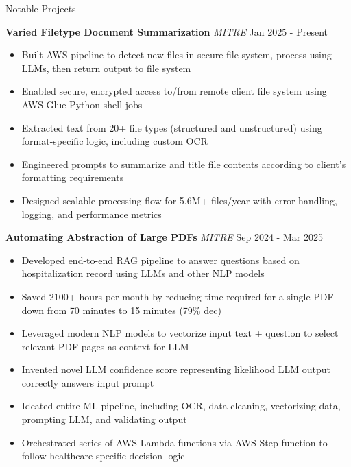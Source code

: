 \documentclass{resume} %
\begin{document}
\begin{rSection}{Notable Projects}

\textbf{Varied Filetype Document Summarization} \textit{MITRE}
\hfill Jan 2025 - Present
\begin{itemize}
    \item Built AWS pipeline to detect new files in secure file system, process using LLMs, then return output to file system
    \item Enabled secure, encrypted access to/from remote client file system using AWS Glue Python shell jobs
    \item Extracted text from 20+ file types (structured and unstructured) using format-specific logic, including custom OCR
    \item Engineered prompts to summarize and title file contents according to client's formatting requirements
    \item Designed scalable processing flow for 5.6M+ files/year with error handling, logging, and performance metrics
\end{itemize}

\textbf{Automating Abstraction of Large PDFs} \textit{MITRE}
\hfill Sep 2024 - Mar 2025
\begin{itemize}
    \item Developed end-to-end RAG pipeline to answer questions based on hospitalization record using LLMs and other NLP models
    \item Saved 2100+ hours per month by reducing time required for a single PDF down from 70 minutes to 15 minutes (79\% dec)
    \item Leveraged modern NLP models to vectorize input text + question to select relevant PDF pages as context for LLM
    \item Invented novel LLM confidence score representing likelihood LLM output correctly answers input prompt
    \item Ideated entire ML pipeline, including OCR, data cleaning, vectorizing data, prompting LLM, and validating output
    \item Orchestrated series of AWS Lambda functions via AWS Step function to follow healthcare-specific decision logic
\end{itemize}


\end{rSection}
\end{document}
